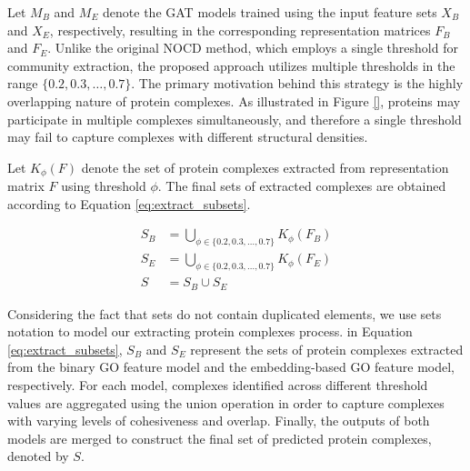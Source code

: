 Let \(M_B\) and \(M_E\) denote the GAT models trained using the input feature sets \(X_B\) and \(X_E\), respectively, resulting in the corresponding representation matrices \(F_B\) and \(F_E\). Unlike the original NOCD method, which employs a single threshold for community extraction, the proposed approach utilizes multiple thresholds in the range \(\{0.2, 0.3, \dots, 0.7\}\). The primary motivation behind this strategy is the highly overlapping nature of protein complexes. As illustrated in Figure \ref{}, proteins may participate in multiple complexes simultaneously, and therefore a single threshold may fail to capture complexes with different structural densities.

Let \(K_{\phi}(F)\) denote the set of protein complexes extracted from representation matrix \(F\) using threshold \(\phi\). The final sets of extracted complexes are obtained according to Equation \ref{eq:extract_subsets}.

\begin{equation}
	\begin{split}	
		S_B &= \bigcup_{\phi \in \{0.2,0.3,\dots,0.7\}} K_{\phi}(F_B) \\
		S_E &= \bigcup_{\phi \in \{0.2,0.3,\dots,0.7\}} K_{\phi}(F_E) \\
		S &= S_B \cup S_E
	\end{split}
	\label{eq:extract_subsets}
\end{equation}

Considering the fact that sets do not contain duplicated elements, we use sets notation to model our extracting protein complexes process. in Equation \ref{eq:extract_subsets}, \(S_B\) and \(S_E\) represent the sets of protein complexes extracted from the binary GO feature model and the embedding-based GO feature model, respectively. For each model, complexes identified across different threshold values are aggregated using the union operation in order to capture complexes with varying levels of cohesiveness and overlap. Finally, the outputs of both models are merged to construct the final set of predicted protein complexes, denoted by \(S\).




